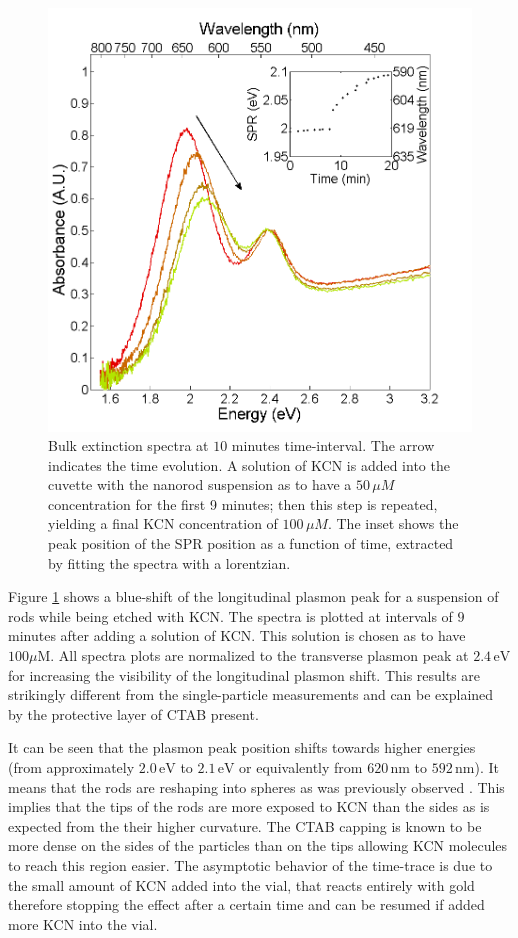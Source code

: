 \documentclass{article}
\begin{document}
\begin{figure}[p]
 \centering 
 \includegraphics[width=0.95\linewidth]{plasmon_bulk.png}
 \caption{Bulk extinction spectra at $10$ minutes time-interval. The arrow
 indicates the time evolution. A solution of KCN is added into the cuvette with
 the nanorod suspension as to have a $50\,\mu M$ concentration for the first 9
 minutes; then this step is repeated, yielding a final KCN concentration of
 $100\, \mu M$. The inset shows the peak position of the SPR position as a
 function of time, extracted by fitting the spectra with a lorentzian.  }
 \label{fig:bulk}
\end{figure}

Figure \ref{fig:bulk} shows a blue-shift of the longitudinal plasmon peak for a
suspension of rods while being etched with KCN. The spectra is plotted at
intervals of $9$ minutes after adding a solution of KCN. This solution is chosen
as to have $100\mu\textrm{M}$. All spectra plots are normalized to the
transverse plasmon peak at $2.4\,\textrm{eV}$ for increasing the visibility of
the longitudinal plasmon shift. This results are strikingly different from the
single-particle measurements and can be explained by the protective layer of
CTAB present. 

It can be seen that the plasmon peak position shifts towards higher energies
(from approximately $2.0\,\textrm{eV}$ to $2.1\,\textrm{eV}$ or equivalently
from $620\,\textrm{nm}$ to $592\,\textrm{nm}$). It means that the rods are
reshaping into spheres as was previously observed \cite{Jana2002}. This implies
that the tips of the rods are more exposed to KCN than the sides as is expected
from the their higher curvature. The CTAB capping is known to be more dense on
the sides of the particles than on the tips allowing KCN molecules to reach this
region easier. The asymptotic behavior of the time-trace is due to the small
amount of KCN added into the vial, that reacts entirely with gold therefore
stopping the effect after a certain time and can be resumed if added more KCN
into the vial.
\end{document}
